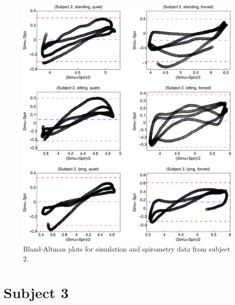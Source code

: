 \begin{figure}[H]
	\centering
	 \includegraphics[width=1\textwidth]{pics/ba_p2_det}
	\caption[Bland-Altman plots for simulation and spirometry data from subject 2]{\label{appB:fig:p2}Bland-Altman plots for simulation and spirometry data from subject 2.}
\end{figure}

\newpage
\section{\label{appendixB:p3}Subject 3}

